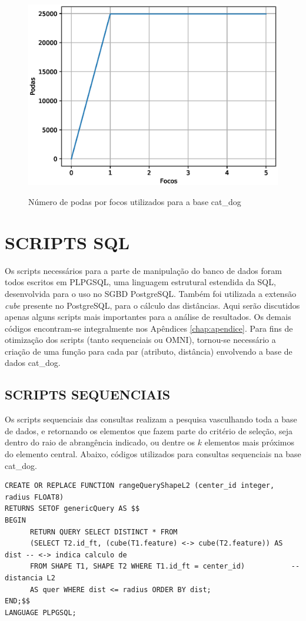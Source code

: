 \begin{figure}[H]
\centering
\caption{Número de podas por focos utilizados para a base cat\_dog}
\includegraphics[width=.6\textwidth]{dados/figuras/fococatdog.eps}
\label{fig:fococatdog}
\end{figure}

\section{SCRIPTS SQL}
Os scripts necessários para a parte de manipulação do banco de dados foram todos escritos em PLPGSQL, uma linguagem estrutural estendida da SQL, desenvolvida para o uso
no SGBD PostgreSQL. Também foi utilizada a extensão \textit{cube} presente no PostgreSQL, para o cálculo das distâncias. Aqui serão discutidos apenas alguns scripts mais importantes para a análise de resultados. Os demais códigos encontram-se integralmente
nos Apêndices \ref{chap:apendice}. Para fins de otimização dos scripts (tanto sequenciais ou OMNI), tornou-se necessário
a criação de uma função para cada par (atributo, distância) envolvendo a base de dados cat\_dog.

\subsection{SCRIPTS SEQUENCIAIS}
Os scripts sequenciais das consultas realizam a pesquisa vasculhando toda a base de dados, e retornando os elementos que fazem
parte do critério de seleção, seja dentro do raio de abrangência indicado, ou dentre os $k$ elementos mais próximos do elemento central.
Abaixo, códigos utilizados para consultas sequenciais na base cat\_dog.

\begin{lstlisting}[caption={Consulta por abrangência sequencial utilizando forma e distância euclidiana\\}, captionpos=t,basicstyle=\tiny] 
CREATE OR REPLACE FUNCTION rangeQueryShapeL2 (center_id integer, radius FLOAT8) 
RETURNS SETOF genericQuery AS $$
BEGIN
	  RETURN QUERY SELECT DISTINCT * FROM 
	  (SELECT T2.id_ft, (cube(T1.feature) <-> cube(T2.feature)) AS dist -- <-> indica calculo de
	  FROM SHAPE T1, SHAPE T2 WHERE T1.id_ft = center_id) 		    -- distancia L2
	  AS quer WHERE dist <= radius ORDER BY dist;	
END;$$
LANGUAGE PLPGSQL;
\end{lstlisting}

